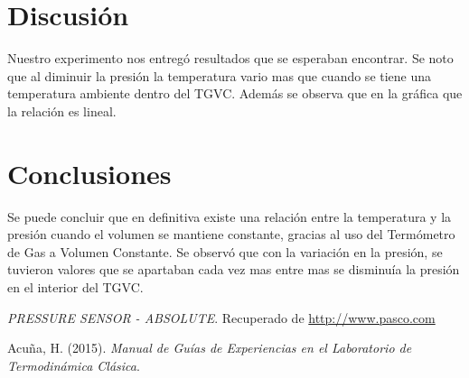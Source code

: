 \documentclass[12pt]{article}
\begin{document}
\section{Discusión}
Nuestro experimento nos entregó resultados que se esperaban encontrar. Se noto que al diminuir la presión la temperatura vario mas que cuando se tiene una temperatura ambiente dentro del TGVC. Además se observa que en la gráfica que la relación es lineal.

\section{Conclusiones}
Se puede concluir que en definitiva existe una relación entre la temperatura y la presión cuando el volumen se mantiene constante, gracias al uso del Termómetro de Gas a Volumen Constante. Se observó que con la variación en la presión, se tuvieron valores que se apartaban cada vez mas entre mas se disminuía la presión en el interior del TGVC.

\pagebreak


\begin{thebibliography}{6}
	
	\textit{PRESSURE SENSOR - ABSOLUTE}. Recuperado de   \url{http://www.pasco.com}

Acu\~na, H. (2015). \textit{Manual de Guías de Experiencias en el Laboratorio de Termodinámica Clásica}.

\end{thebibliography}
\end{document}

